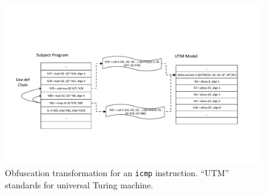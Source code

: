 \documentclass[lnicst]{svmultln}
\begin{document}
\begin{figure}
 \includegraphics[width=\linewidth]{transform_pass.pdf}
 \caption{Obfuscation transformation for an \texttt{icmp} instruction. ``UTM''
   standards for universal Turing machine.}
 \label{fig:six}
\end{figure}
\end{document}
